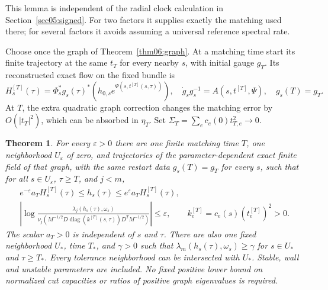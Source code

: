 \documentclass[11pt]{amsart}
\newtheorem{theorem}{Theorem}[section]
\theoremstyle{definition}
\theoremstyle{remark}
\newcommand{\diag}{\operatorname{diag}}
\begin{document}
This lemma is independent of the radial clock calculation in
Section~\ref{sec05:signed}. For two factors it supplies exactly the
matching used there; for several factors it avoids assuming a
universal reference spectral rate.

Choose once the graph of Theorem~\ref{thm06:graph}. At a matching
time start its finite trajectory at the same \(t_T\) for every
nearby \(s\), with initial gauge \(g_T\). Its reconstructed exact
flow on the fixed bundle is
\begin{equation}\label{eq08:model}
 H_s^{[T]}(\tau)=\Phi_s^*g_s(\tau)^*
                  (h_{0,s}e^{\Psi(s,t^{[T]}(s,\tau))}),\quad
 \dot g_sg_s^{-1}=A(s,t^{[T]},\Psi),\quad g_s(T)=g_T.
\end{equation}
At \(T\), the extra quadratic graph correction changes the matching
error by \(O(|t_T|^2)\), which can be absorbed in \(\eta_T\).
Set \(\Sigma_T=\sum_ec_e(0)t_{T,e}^2\to0\).

\begin{theorem}\label{thm08:flow}
For every \(\varepsilon>0\) there are one finite matching time
\(T\), one neighborhood \(U_\varepsilon\) of zero, and trajectories
of the parameter-dependent exact finite field of that graph, with
the same restart data \(g_s(T)=g_T\) for every \(s\), such that for all
\(s\in U_\varepsilon\), \(\tau\ge T\), and \(j<m\),
\begin{equation}\label{eq08:joint}
 \begin{gathered}
 e^{-\varepsilon}a_TH_s^{[T]}(\tau)
       \le h_s(\tau)\le e^\varepsilon a_TH_s^{[T]}(\tau),\\
 \left|\log\frac{\lambda_j(h_s(\tau),\omega_s)}
 {\nu_j(M^{-1/2}D\diag(k^{[T]}(s,\tau))D^TM^{-1/2})}\right|
       \le\varepsilon,\qquad k_e^{[T]}=c_e(s)(t_e^{[T]})^2>0.
 \end{gathered}
\end{equation}
The scalar \(a_T>0\) is independent of \(s\) and \(\tau\).
There are also one fixed neighborhood \(U_*\), time \(T_*\), and
\(\gamma>0\) such that \(\lambda_m(h_s(\tau),\omega_s)\ge\gamma\)
for \(s\in U_*\) and \(\tau\ge T_*\). Every tolerance neighborhood
can be intersected with \(U_*\). Stable, wall and unstable parameters
are included. No fixed positive lower bound on normalized cut
capacities or ratios of positive graph eigenvalues is required.
\end{theorem}
\end{document}
